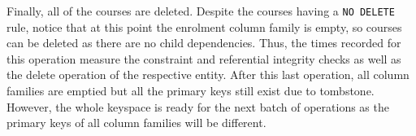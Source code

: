 \begin{description}
Finally, all of the courses are deleted. Despite the courses having a \texttt{NO
DELETE} rule, notice that at this point the enrolment column family is empty, so
courses can be deleted as there are no child dependencies. Thus, the times
recorded for this operation measure the constraint and referential integrity
checks as well as the delete operation of the respective entity. After this last
operation, all column families are emptied but all the primary keys still exist
due to tombstone. However, the whole keyspace is ready for the next batch of
operations as the primary keys of all column families will be different.


\end{description}		

			
			

		
 






